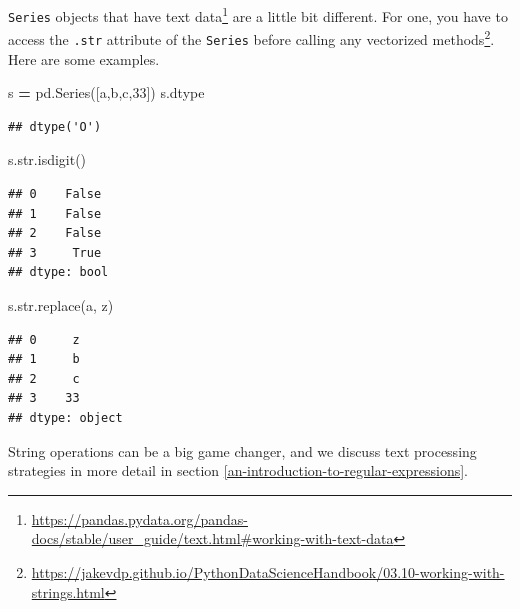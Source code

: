 \documentclass[
  12pt,
  krantz2]{krantz}
\makeatletter
\newenvironment{Shaded}{\begin{snugshade}}{\end{snugshade}}
\newcommand{\BuiltInTok}[1]{#1}
\newcommand{\NormalTok}[1]{#1}
\newcommand{\OperatorTok}[1]{\textcolor[rgb]{0.43,0.43,0.43}{\textbf{#1}}}
\newcommand{\StringTok}[1]{\textcolor[rgb]{0.5,0.5,0.5}{#1}}
\renewcommand{\href}[2]{#2\footnote{\url{#1}}}
\newenvironment{kframe}{%
\medskip{}
\setlength{\fboxsep}{.8em}
 \def\at@end@of@kframe{}%
 \ifinner\ifhmode%
  \def\at@end@of@kframe{\end{minipage}}%
  \begin{minipage}{\columnwidth}%
 \fi\fi%
 \def\FrameCommand##1{\hskip\@totalleftmargin \hskip-\fboxsep
 \colorbox{shadecolor}{##1}\hskip-\fboxsep
     \hskip-\linewidth \hskip-\@totalleftmargin \hskip\columnwidth}%
 \MakeFramed {\advance\hsize-\width
   \@totalleftmargin\z@ \linewidth\hsize
   \@setminipage}}%
 {\par\unskip\endMakeFramed%
 \at@end@of@kframe}
\renewenvironment{Shaded}{\begin{kframe}}{\end{kframe}}
\makeatother
\begin{document}
\texttt{Series} objects that have \href{https://pandas.pydata.org/pandas-docs/stable/user_guide/text.html\#working-with-text-data}{text data} are a little bit different. For one, you have to access the \texttt{.str} attribute of the \texttt{Series} before calling any \href{https://jakevdp.github.io/PythonDataScienceHandbook/03.10-working-with-strings.html}{vectorized methods}. Here are some examples.

\begin{Shaded}
\begin{Highlighting}[]
\NormalTok{s }\OperatorTok{=}\NormalTok{ pd.Series([}\StringTok{\textquotesingle{}a\textquotesingle{}}\NormalTok{,}\StringTok{\textquotesingle{}b\textquotesingle{}}\NormalTok{,}\StringTok{\textquotesingle{}c\textquotesingle{}}\NormalTok{,}\StringTok{\textquotesingle{}33\textquotesingle{}}\NormalTok{])}
\NormalTok{s.dtype}
\end{Highlighting}
\end{Shaded}

\begin{verbatim}
## dtype('O')
\end{verbatim}

\begin{Shaded}
\begin{Highlighting}[]
\NormalTok{s.}\BuiltInTok{str}\NormalTok{.isdigit()}
\end{Highlighting}
\end{Shaded}

\begin{verbatim}
## 0    False
## 1    False
## 2    False
## 3     True
## dtype: bool
\end{verbatim}

\begin{Shaded}
\begin{Highlighting}[]
\NormalTok{s.}\BuiltInTok{str}\NormalTok{.replace(}\StringTok{\textquotesingle{}a\textquotesingle{}}\NormalTok{, }\StringTok{\textquotesingle{}z\textquotesingle{}}\NormalTok{)}
\end{Highlighting}
\end{Shaded}

\begin{verbatim}
## 0     z
## 1     b
## 2     c
## 3    33
## dtype: object
\end{verbatim}

String operations can be a big game changer, and we discuss text processing strategies in more detail in section \ref{an-introduction-to-regular-expressions}.
\end{document}
